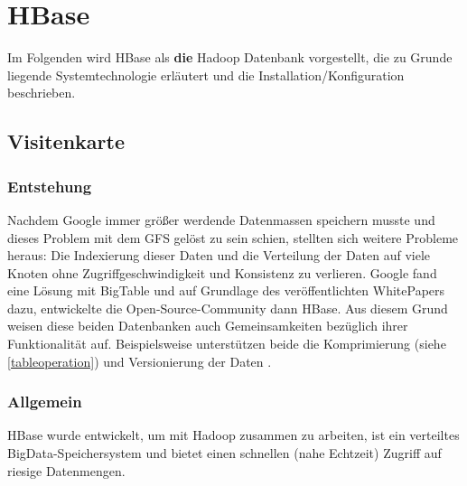 \section{HBase}



Im Folgenden wird HBase als \textbf{die} Hadoop Datenbank vorgestellt, die zu Grunde liegende Systemtechnologie erläutert  und die Installation/Konfiguration beschrieben.
\subsection{Visitenkarte}
\subsubsection{Entstehung}
Nachdem Google immer größer werdende Datenmassen speichern musste und dieses Problem mit dem  \ac{GFS} gelöst zu sein schien, stellten sich weitere Probleme heraus: 
Die Indexierung dieser Daten und die Verteilung der Daten auf viele Knoten ohne Zugriffgeschwindigkeit und Konsistenz zu verlieren. Google fand eine Lösung mit BigTable und auf Grundlage des veröffentlichten WhitePapers \cite{bigtable} dazu, entwickelte die Open-Source-Community dann HBase. Aus diesem Grund weisen diese beiden Datenbanken auch Gemeinsamkeiten bezüglich ihrer Funktionalität auf. Beispielsweise unterstützen beide die Komprimierung (siehe \ref{tableoperation}) und Versionierung der Daten \cite{SpaOd16}.

\subsubsection{Allgemein}
HBase wurde entwickelt, um mit Hadoop zusammen zu arbeiten, ist ein verteiltes BigData-Speichersystem 
 und bietet einen schnellen (nahe Echtzeit) Zugriff auf riesige Datenmengen.



